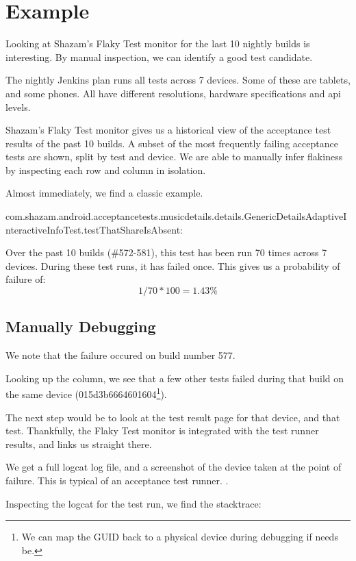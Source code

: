 \section{Example}
\label{sec:example}

Looking at Shazam's Flaky Test monitor for the last 10 nightly builds is interesting. By manual inspection, we can identify a good \flaky{} test candidate.

The nightly Jenkins plan runs all tests across 7 devices. Some of these are tablets, and some phones. All have different resolutions, hardware specifications and api levels.

Shazam's Flaky Test monitor gives us a historical view of the acceptance test results of the past 10 builds. A subset of the most frequently failing acceptance tests are shown, split by test and device. We are able to manually infer flakiness by inspecting each row and column in isolation.

Almost immediately, we find a classic example.

com.shazam.android.acceptancetests.musicdetails.details.GenericDetailsAdaptiveInteractiveInfoTest.testThatShareIsAbsent:

Over the past 10 builds (\#572-581), this test has been run 70 times across 7 devices. During these test runs, it has failed once. This gives us a probability of failure of:
$$ 1 / 70 * 100 = 1.43\% $$

\subsection{Manually Debugging}

We note that the failure occured on build number 577.

Looking up the column, we see that a few other tests failed during that build on the same device (015d3b6664601604\footnote{We can map the GUID back to a physical device during debugging if needs be.}).

The next step would be to look at the test result page for that device, and that test. Thankfully, the Flaky Test monitor is integrated with the test runner results, and links us straight there.

We get a full logcat log file, and a screenshot of the device taken at the point of failure. This is typical of an acceptance test runner. .

Inspecting the logcat  for the test run, we find the stacktrace:

